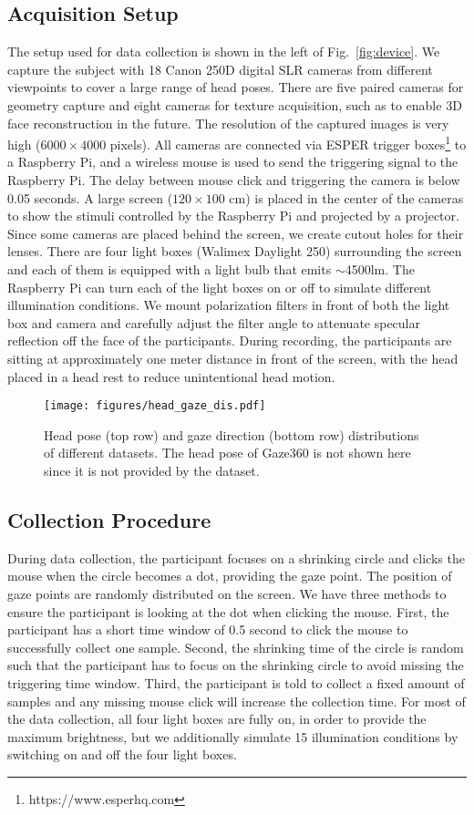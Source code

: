 \documentclass[runningheads]{llncs}
\begin{document}
\subsection{Acquisition Setup}
The setup used for data collection is shown in the left of Fig.~\ref{fig:device}.
We capture the subject with 18 Canon 250D digital SLR cameras from different viewpoints to cover a large range of head poses.
There are five paired cameras for geometry capture and eight cameras for texture acquisition, such as to enable 3D face reconstruction in the future. The resolution of the captured images is very high ($6000\times4000$ pixels).
All cameras are connected via ESPER trigger boxes\footnote{https://www.esperhq.com} to a Raspberry Pi, and a wireless mouse is used to send the triggering signal to the Raspberry Pi.
The delay between mouse click and triggering the camera is below 0.05 seconds.
A large screen ($120\times100$ cm) is placed in the center of the cameras to show the stimuli controlled by the Raspberry Pi and projected by a projector. Since some cameras are placed behind the screen, we create cutout holes for their lenses. 
There are four light boxes (Walimex Daylight 250) surrounding the screen and each of them is equipped with a light bulb that emits $\sim$4500lm.
The Raspberry Pi can turn each of the light boxes on or off to simulate different illumination conditions.
We mount polarization filters in front of both the light box and camera and carefully adjust the filter angle to attenuate specular reflection off the face of the participants.
During recording, the participants are sitting at approximately one meter distance in front of the screen, with the head placed in a head rest to reduce unintentional head motion.

\begin{figure}[t]
    \centering
    \texttt{[image: figures/head\_gaze\_dis.pdf]}
    \caption{Head pose (top row) and gaze direction (bottom row) distributions of different datasets. The head pose of Gaze360 is not shown here since it is not provided by the dataset.}
    \label{fig:head_gaze_dis}
\end{figure}
\subsection{Collection Procedure}
During data collection, the participant focuses on a shrinking circle and clicks the mouse when the circle becomes a dot, providing the gaze point.
The position of gaze points are randomly distributed on the screen.
We have three methods to ensure the participant is looking at the dot when clicking the mouse.
First, the participant has a short time window of 0.5 second to click the mouse to successfully collect one sample.
Second, the shrinking time of the circle is random such that the participant has to focus on the shrinking circle to avoid missing the triggering time window.
Third, the participant is told to collect a fixed amount of samples and any missing mouse click will increase the collection time.
For most of the data collection, all four light boxes are fully on, in order to provide the maximum brightness, but we additionally simulate 15 illumination conditions by switching on and off the four light boxes.
\end{document}
